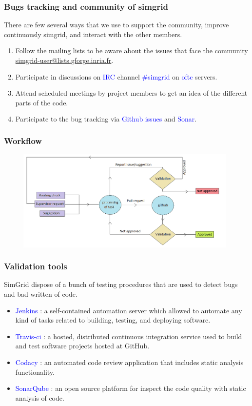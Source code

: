 \begin{frame}\frametitle{Bugs tracking and community of simgrid}
There are few several ways that we use to support the community, improve continuously simgrid, and interact with the other members.
\begin{enumerate}
\item Follow the mailing lists to be aware about the issues that face the community \textcolor{blue}{\url{simgrid-user@lists.gforge.inria.fr}}. 
\item Participate in discussions on \textcolor{blue}{IRC} channel \textcolor{blue}{$\# $simgrid} on \textcolor{blue}{oftc} servers. %
\item Attend scheduled meetings by project members to get an idea of the different parts of the code.
\item Participate to the bug tracking via \textcolor{blue}{Github issues} and \textcolor{blue}{Sonar}.
\end{enumerate}
\end{frame}
\begin{frame}\frametitle{Workflow}
\begin{figure}
\includegraphics[width=11cm]{figures/productiont.png}
\end{figure}
\end{frame}
\begin{frame}\frametitle{Validation tools}
SimGrid dispose of a bunch of testing procedures that are used to detect bugs and bad written of code.
\begin{itemize}
\item \textcolor{blue}{Jenkins} : a self-contained automation server which allowed to automate any kind of tasks related to building, testing, and deploying software.
\item \textcolor{blue}{Travis-ci} : a hosted, distributed continuous integration service used to build and test software projects hosted at GitHub.
\item \textcolor{blue}{Codacy} : an automated code review application that includes static analysis functionality.
\item \textcolor{blue}{SonarQube} : an open source platform for inspect the code quality with static analysis of code.
\end{itemize}

\end{frame}